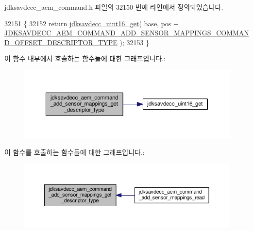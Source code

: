 jdksavdecc\+\_\+aem\+\_\+command.\+h 파일의 32150 번째 라인에서 정의되었습니다.


\begin{DoxyCode}
32151 \{
32152     \textcolor{keywordflow}{return} \hyperlink{group__endian_ga3fbbbc20be954aa61e039872965b0dc9}{jdksavdecc\_uint16\_get}( base, pos + 
      \hyperlink{group__command__add__sensor__mappings_ga14bc603f9eb0a6055b75c102bdfadd3d}{JDKSAVDECC\_AEM\_COMMAND\_ADD\_SENSOR\_MAPPINGS\_COMMAND\_OFFSET\_DESCRIPTOR\_TYPE}
       );
32153 \}
\end{DoxyCode}


이 함수 내부에서 호출하는 함수들에 대한 그래프입니다.\+:
\nopagebreak
\begin{figure}[H]
\begin{center}
\leavevmode
\includegraphics[width=350pt]{group__command__add__sensor__mappings_ga8410075024ae127094c18ebbbf35748b_cgraph}
\end{center}
\end{figure}




이 함수를 호출하는 함수들에 대한 그래프입니다.\+:
\nopagebreak
\begin{figure}[H]
\begin{center}
\leavevmode
\includegraphics[width=350pt]{group__command__add__sensor__mappings_ga8410075024ae127094c18ebbbf35748b_icgraph}
\end{center}
\end{figure}


